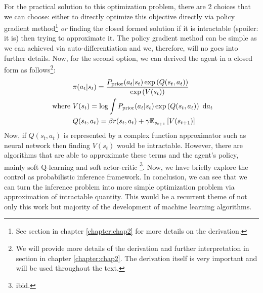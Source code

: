 For the practical solution to this optimization problem, there are 2 choices that we can choose: either to directly optimize this objective directly via policy gradient method\footnote{See section in chapter \ref{chapter:chap2} for more details on the derivation.} \textit{or} finding the closed formed solution if it is intractable (spoiler: it is) then trying to approximate it. The policy gradient method can be simple as we can achieved via auto-differentiation and we, therefore, will no goes into further details. Now, for the second option, we can derived the agent in a closed form as follows\footnote{We will provide more details of the derivation and further interpretation in section in chapter \ref{chapter:chap2}. The derivation itself is very important and will be used throughout the text.}:
\begin{equation}
\begin{aligned}
    &\pi(a_t | s_t) = \frac{P_{\text{prior}}(a_t | s_t) \exp\left( Q(s_t, a_t) \right)}{\exp\left( V(s_t) \right)} \\
    \text{ where }& V(s_t) = \log \int P_{\text{prior}}(a_t | s_t) \exp\left( Q(s_t, a_t) \right) \ \mathrm{d} a_t \\
    &Q(s_t, a_t) = \beta r(s_t, a_t) + \gamma\mathbb{E}_{s_{t+1}}\left[ V(s_{t+1}) \right]
\end{aligned}
\end{equation}
Now, if $Q(s_t, a_t)$ is represented by a complex function approximator such as neural network then finding $V(s_t)$ would be intractable. However, there are algorithms that are able to approximate these terms and the agent's policy, mainly soft Q-learning \cite{haarnoja2017reinforcement} and soft actor-critic \cite{haarnoja2018softa, haarnoja2018softb}\footnote{ibid.}. Now, we have briefly explore the control as probabilistic inference framework. In conclusion, we can see that we can turn the inference problem into more simple optimization problem via approximation of intractable quantity. This would be a recurrent theme of not only this work but majority of the development of machine learning algorithms.  

